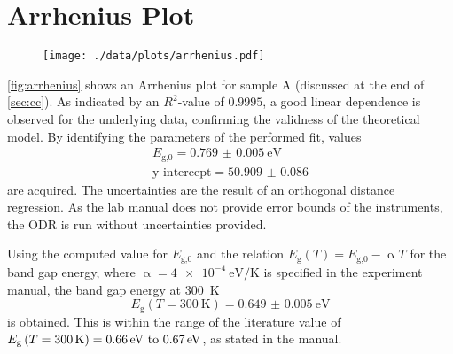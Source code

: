 
\section{Arrhenius Plot}\label{sec:arrhenius}
\begin{figure}
	\centering
	\texttt{[image: ./data/plots/arrhenius.pdf]}
	\label{fig:arrhenius}
\end{figure}

\autoref{fig:arrhenius} shows an Arrhenius plot for sample A (discussed at the end of \autoref{sec:cc}).
As indicated by an $R^2$-value of $0.9995$, a good linear dependence is observed for the underlying data, confirming the validness of the theoretical model.
By identifying the parameters of the performed fit, values
\begin{align*}
	E_\text{g,0} = \SI{0.769(5)}{\eV} \\
	\text{y-intercept} = \num{50.909(86)} %
\end{align*}
are acquired.
The uncertainties are the result of an orthogonal distance regression.
As the lab manual does not provide error bounds of the instruments, the ODR is run without uncertainties provided.

Using the computed value for $E_\text{g,0}$ and the relation $E_\text{g}(T) = E_\text{g,0} -\upalpha T$ for the band gap energy, where $\upalpha=\SI{4e-4}{\eV\per\kelvin}$ is specified in the experiment manual, the band gap energy at \SI{300}{\kelvin}
\begin{equation*}
	E_\text{g}\left(T = \SI{300}{\kelvin}\right) = \SI{0.649(5)}{\eV}
\end{equation*}
is obtained.
This is within the range of the literature value of $E_\text{g}\left(T = \SI{300}{\kelvin}\right) = \text{\SIrange{0.66}{0.67}{\eV}}$, as stated in the manual.

